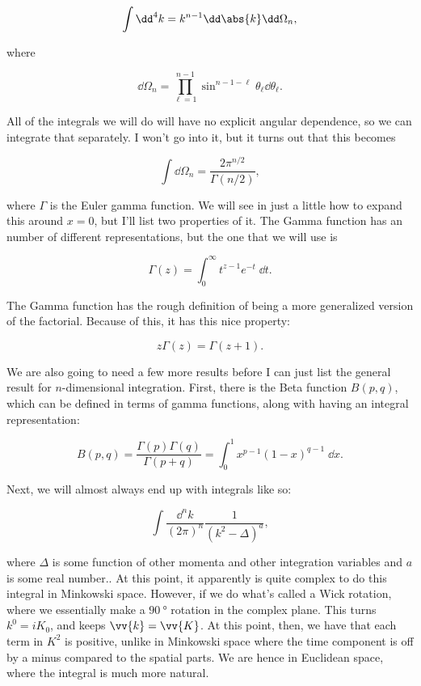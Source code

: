 \documentclass[titlepage]{article}
\begin{document}
\begin{equation}
  \int \dd^4k = k^{n-1} \dd\abs{k} \dd\Omega_n,
\end{equation}

where

\begin{equation}
  \dd\Omega_n = \prod_{\ell=1}^{n-1} \sin^{n-1-\ell}\theta_\ell \dd\theta_\ell.
\end{equation}

All of the integrals we will do will have no explicit angular dependence, so we can integrate that separately. I won't go into it, but it turns out that this becomes

\begin{equation}
  \int \dd\Omega_n = \frac{2\pi^{n/2}}{\Gamma(n/2)},
\end{equation}

where $\Gamma$ is the Euler gamma function. We will see in just a little how to expand this around $x=0$, but I'll list two properties of it. The Gamma function has an number of different representations, but the one that we will use is

\begin{equation}
  \Gamma(z) = \int_0^{\infty} t^{z-1}e^{-t} \;\dd t.
\end{equation}

The Gamma function has the rough definition of being a more generalized version of the factorial. Because of this, it has this nice property:

\begin{equation}
  z\Gamma(z) = \Gamma(z+1).
\end{equation}

We are also going to need a few more results before I can just list the general result for $n$-dimensional integration. First, there is the Beta function $B(p,q)$, which can be defined in terms of gamma functions, along with having an integral representation:

\begin{equation}
  B(p,q) = \frac{\Gamma(p)\Gamma(q)}{\Gamma(p+q)} = \int_0^1 x^{p-1}(1-x)^{q-1} \;\dd x.
\end{equation}

Next, we will almost always end up with integrals like so:

\begin{equation}
  \int \frac{\dd^nk}{(2\pi)^n} \frac{1}{(k^2 - \Delta)^a},
\end{equation}

where $\Delta$ is some function of other momenta and other integration variables and $a$ is some real number.. At this point, it apparently is quite complex to do this integral in Minkowski space. However, if we do what's called a Wick rotation, where we essentially make a $\qty{90}{\degree}$ rotation in the complex plane. This turns $k^0 = iK_0$, and keeps $\vv{k} = \vv{K}$. At this point, then, we have that each term in $K^2$ is positive, unlike in Minkowski space where the time component is off by a minus compared to the spatial parts. We are hence in Euclidean space, where the integral is much more natural.
\end{document}
